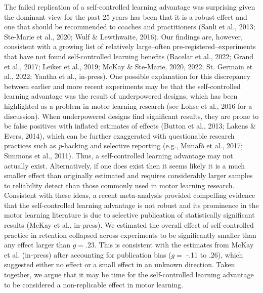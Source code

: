 \documentclass[
  man, donotrepeattitle,floatsintext]{apa7}
\begin{document}
The failed replication of a self-controlled learning advantage was surprising given the dominant view for the past 25 years has been that it is a robust effect and one that should be recommended to coaches and practitioners (Sanli et al., 2013; Ste-Marie et al., 2020; Wulf \& Lewthwaite, 2016). Our findings are, however, consistent with a growing list of relatively large--often pre-registered--experiments that have not found self-controlled learning benefits (Bacelar et al., 2022; Grand et al., 2017; Leiker et al., 2019; McKay \& Ste-Marie, 2020, 2022; St. Germain et al., 2022; Yantha et al., in-press). One possible explanation for this discrepancy between earlier and more recent experiments may be that the self-controlled learning advantage was the result of underpowered designs, which has been highlighted as a problem in motor learning research (see Lohse et al., 2016 for a discussion). When underpowered designs find significant results, they are prone to be false positives with inflated estimates of effects (Button et al., 2013; Lakens \& Evers, 2014), which can be further exaggerated with questionable research practices such as \emph{p}-hacking and selective reporting (e.g., Munafò et al., 2017; Simmons et al., 2011). Thus, a self-controlled learning advantage may not actually exist. Alternatively, if one does exist then it seems likely it is a much smaller effect than originally estimated and requires considerably larger samples to reliability detect than those commonly used in motor learning research. Consistent with these ideas, a recent meta-analysis provided compelling evidence that the self-controlled learning advantage is not robust and its prominence in the motor learning literature is due to selective publication of statistically significant results (McKay et al., in-press). We estimated the overall effect of self-controlled practice in retention collapsed across experiments to be significantly smaller than any effect larger than \(g = .23\). This is consistent with the estimates from McKay et al. (in-press) after accounting for publication bias (\(g =\) -.11 to .26), which suggested either no effect or a small effect in an unknown direction. Taken together, we argue that it may be time for the self-controlled learning advantage to be considered a non-replicable effect in motor learning.
\end{document}
